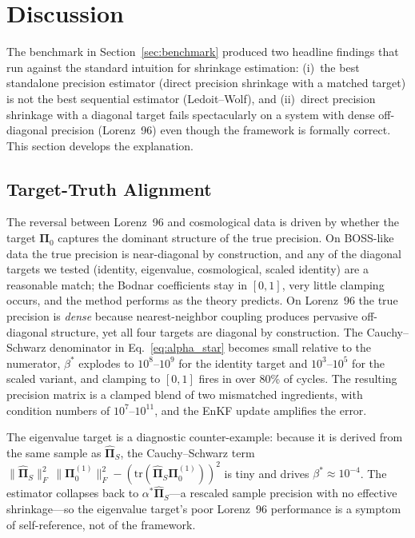 \section{Discussion}
\label{sec:discussion}

The benchmark in Section~\ref{sec:benchmark} produced two headline findings that run against the standard intuition for shrinkage estimation: (i)~the best standalone precision estimator (direct precision shrinkage with a matched target) is not the best sequential estimator (Ledoit--Wolf), and (ii)~direct precision shrinkage with a diagonal target fails spectacularly on a system with dense off-diagonal precision (Lorenz~96) even though the framework is formally correct. This section develops the explanation.

\subsection{Target-Truth Alignment}
\label{sec:disc_alignment}

The reversal between Lorenz~96 and cosmological data is driven by whether the target $\boldsymbol{\Pi}_0$ captures the dominant structure of the true precision. On BOSS-like data the true precision is near-diagonal by construction, and any of the diagonal targets we tested (identity, eigenvalue, cosmological, scaled identity) are a reasonable match; the Bodnar coefficients stay in $[0,1]$, very little clamping occurs, and the method performs as the theory predicts. On Lorenz~96 the true precision is \emph{dense} because nearest-neighbor coupling produces pervasive off-diagonal structure, yet all four targets are diagonal by construction. The Cauchy--Schwarz denominator in Eq.~\eqref{eq:alpha_star} becomes small relative to the numerator, $\beta^*$ explodes to $10^8$--$10^9$ for the identity target and $10^3$--$10^5$ for the scaled variant, and clamping to $[0,1]$ fires in over 80\% of cycles. The resulting precision matrix is a clamped blend of two mismatched ingredients, with condition numbers of $10^7$--$10^{11}$, and the EnKF update amplifies the error.

The eigenvalue target is a diagnostic counter-example: because it is derived from the same sample as $\hat{\boldsymbol{\Pi}}_S$, the Cauchy--Schwarz term $\|\hat{\boldsymbol{\Pi}}_S\|_F^2\,\|\boldsymbol{\Pi}_0^{(1)}\|_F^2 - (\mathrm{tr}(\hat{\boldsymbol{\Pi}}_S \boldsymbol{\Pi}_0^{(1)}))^2$ is tiny and drives $\beta^* \approx 10^{-4}$. The estimator collapses back to $\alpha^* \hat{\boldsymbol{\Pi}}_S$---a rescaled sample precision with no effective shrinkage---so the eigenvalue target's poor Lorenz~96 performance is a symptom of self-reference, not of the framework.

